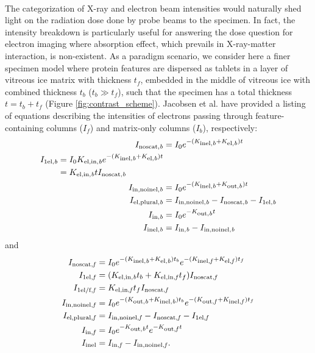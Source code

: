 \documentclass[review]{elsarticle}
\newcommand\nt{\textup{\scriptsize{0}}}
\newcommand\inel{\textup{\scriptsize{inel}}}
\newcommand\elb{\textup{\scriptsize{el,\textit b}}}
\newcommand\inelb{\textup{\scriptsize{inel,\textit b}}}
\newcommand\elinb{\textup{\scriptsize{el,in,\textit b}}}
\newcommand\outb{\textup{\scriptsize{out,\textit b}}}
\newcommand\noscatb{\textup{\scriptsize{noscat,\textit b}}}
\newcommand\selb{\textup{\scriptsize{1el,\textit b}}}
\newcommand\elplb{\textup{\scriptsize{el,plural,\textit b}}}
\newcommand\innoinelb{\textup{\scriptsize{in,noinel,\textit b}}}
\newcommand\inb{\textup{\scriptsize{in,\textit b}}}
\newcommand\elf{\textup{\scriptsize{el,\textit f}}}
\newcommand\inelf{\textup{\scriptsize{inel,\textit f}}}
\newcommand\elinf{\textup{\scriptsize{el,in,\textit f}}}
\newcommand\outf{\textup{\scriptsize{out,\textit f}}}
\newcommand\noscatf{\textup{\scriptsize{noscat,\textit f}}}
\newcommand\self{\textup{\scriptsize{1el,\textit f}}}
\newcommand\selff{\textup{\scriptsize{1el/f,\textit f}}}
\newcommand\elplf{\textup{\scriptsize{el,plural,\textit f}}}
\newcommand\innoinelf{\textup{\scriptsize{in,noinel,\textit f}}}
\newcommand\inff{\textup{\scriptsize{in,\textit f}}}
\begin{document}
\paragraph{} The categorization of X-ray and electron beam intensities would naturally shed light on the radiation dose done by probe beams to the specimen. In fact, the intensity breakdown is particularly useful for answering the dose question for electron imaging where absorption effect, which prevails in X-ray-matter interaction, is non-existent. As a paradigm scenario, we consider here a finer specimen model where protein features are dispersed as tablets in a layer of vitreous ice matrix with thickness $t_f$, embedded in the middle of vitreous ice with combined thickness $t_b$ ($t_b \gg t_f$), such that the specimen has a total thickness $t = t_b + t_f$ (Figure \ref{fig:contrast_scheme}). Jacobsen et al. \cite{Jacobsen:1998vj} have provided a listing of equations describing the intensities of electrons passing through feature-containing columns ($I_f$) and matrix-only columns ($I_b$), respectively:
\begin{align}
I_{\noscatb} &= I_{\nt}e^{-(K_{\inelb}+K_{\elb})t}
\label{xb1} \\
\begin{split}
\label{xb2}
I_{\selb} &= I_{\nt}K_{\elinb}e^{-(K_{\inelb}+K_{\elb})t} \\ 
	&= K_{\elinb}t I_{\noscatb}
\end{split} \\
I_{\innoinelb} &= I_{\nt}e^{-(K_{\inelb}+K_{\outb})t}
\label{xb3} \\
I_{\elplb} &= I_{\innoinelb} - I_{\noscatb} - I_{\selb}
\label{xb4} \\
I_{\inb} &= I_{\nt}e^{-K_{\outb}t} 
\label{xb5} \\
I_{\inelb} &= I_{\inb} - I_{\innoinelb}
\label{xb7} \\
\end{align} %
and
\begin{align}
I_{\noscatf} &= I_{\nt}e^{-(K_{\inelb}+K_{\elb})t_b}e^{-(K_{\inelf}+K_{\elf})t_f}
\label{xf1} \\
I_{\self} &= (K_{\elinb}t_b + K_{\elinf}t_f) I_{\noscatf}
\label{xf2} \\
I_{\selff} &= K_{\elinf}t_f I_{\noscatf}
\label{xf2.5} \\
I_{\innoinelf} &= I_{\nt} e^{-(K_{\outb}+K_{\inelb})t_b} e^{-(K_{\outf}+K_{\inelf})t_f}
\label{xf3} \\
I_{\elplf} &= I_{\innoinelf} - I_{\noscatf} - I_{\self}
\label{xf4} \\
I_{\inff} &= I_{\nt}e^{-K_{\outb}t}e^{-K_{\outf}t}
\label{xb5} \\
I_{\inel} &= I_{\inff} - I_{\innoinelf}.
\label{xf7} \\
\end{align} %
\end{document}

